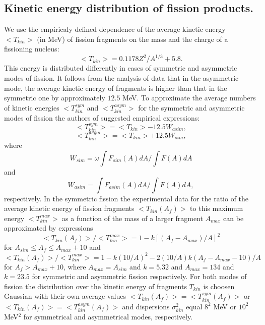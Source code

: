   
\subsection{Kinetic energy distribution of fission products.}

\hspace{1.0em}We use the empiricaly defined \cite{VKW85} dependence of 
the average kinetic energy $<T_{kin}>$ (in MeV) of fission fragments on
the mass and the charge of a fissioning nucleus:
\begin{equation}
\label{FPS13}<T_{kin}> = 0.1178 Z^2/A^{1/3} + 5.8.
\end{equation}
This energy is distributed differently in cases of symmetric and
asymmetric modes of fission.  It follows from the analysis of data
\cite{ABIM93} that in the asymmetric mode, the average kinetic energy of
fragments is higher than that in the symmetric one by approximately
$12.5$ MeV. To approximate the average numbers of kinetic energies
$<T_{kin}^{sym}$ and $<T_{kin}^{asym}>$ for the symmetric and asymmetric
modes of fission the authors of \cite{ABIM93} suggested empirical
expressions:
\begin{equation}
\label{FPS14} <T_{kin}^{sym}> = <T_{kin}> - 12.5 W_{asim}, 
\end{equation}
\begin{equation}
\label{FPS15} <T_{kin}^{asym}> = <T_{kin}> + 12.5 W_{sim},
\end{equation} 
where 
\begin{equation}
\label{FPS16} W_{sim} = \omega \int F_{sim}(A)dA/\int F(A)dA
\end{equation}
and
\begin{equation}
\label{FPS17} W_{asim} = \int F_{asim}(A)dA/\int F(A)dA,
\end{equation} 
respectively. In the symmetric fission the experimental data for the
ratio of the average kinetic energy of fission fragments
$<T_{kin}(A_f)>$ to this maximum energy $<T^{max}_{kin}>$ as a function
of the mass of a larger fragment $A_{max}$ can be approximated by
expressions
\begin{equation}
\label{FPS18} <T_{kin}(A_f)>/<T^{max}_{kin}> = 
1 - k [(A_f - A_{max})/A]^2
\end{equation}
for $A_{sim} \leq A_f \leq A_{max} + 10$ and 
\begin{equation}
\label{FPS19} <T_{kin}(A_f)>/<T^{max}_{kin}> = 
1 - k(10/A)^2 - 2 (10/A)k(A_f - A_{max} - 10)/A
\end{equation}
for $A_f > A_{max} + 10$, where $A_{max} = A_{sim}$ and $k = 5.32$ and
$A_{max} = 134$ and $k = 23.5$ for symmetric and asymmetric fission
respectively.  For both modes of fission the distribution over the
kinetic energy of fragments $T_{kin}$ is choosen Gaussian with their own
average values $<T_{kin}(A_f)>= <T_{kin}^{sym}(A_f)>$ or
$<T_{kin}(A_f)>=<T_{kin}^{asym}(A_f)>$ and dispersions $\sigma^2_{kin}$
equal $8^2$ MeV or $10^2$ MeV$^2$ for symmetrical and asymmetrical
modes, respectively. 

